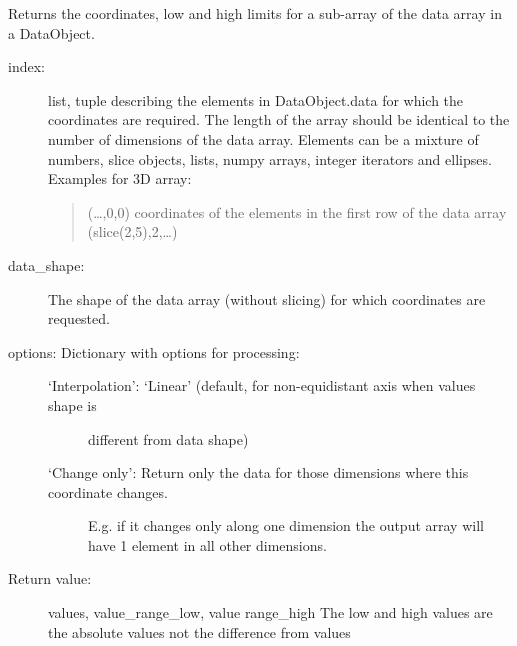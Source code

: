 \documentclass[letterpaper,10pt,english]{sphinxmanual}
\begin{document}
\begin{fulllineitems}

\begin{fulllineitems}
\label{\detokenize{coordinate:flap.coordinate.Coordinate.data}}
Returns the coordinates, low and high limits for a sub-array of the data array in a DataObject.
\begin{description}
\item[{index:}] \leavevmode
list, tuple describing the elements in DataObject.data for which the coordinates are
required. The length of the array should be identical to the number of dimensions
of the data array. Elements can be a mixture of numbers, slice objects, lists, numpy arrays,
integer iterators and ellipses.
Examples for 3D array:
\begin{quote}

(…,0,0) coordinates of the elements in the first row of the data array
(slice(2,5),2,…)
\end{quote}

\item[{data\_shape:}] \leavevmode
The shape of the data array (without slicing) for which coordinates are requested.

\item[{options: Dictionary with options for processing:}] \leavevmode\begin{description}
\item[{‘Interpolation’: ‘Linear’ (default, for non-equidistant axis when values shape is}] \leavevmode
different from data shape)

\item[{‘Change only’: Return only the data for those dimensions where this coordinate changes.}] \leavevmode
E.g. if it changes only along one dimension the output array will have 1 element
in all other dimensions.

\end{description}

\item[{Return value:}] \leavevmode
values, value\_range\_low, value range\_high
The low and high values are the absolute values not the difference from values

\end{description}

\end{fulllineitems}


\end{fulllineitems}
\end{document}

